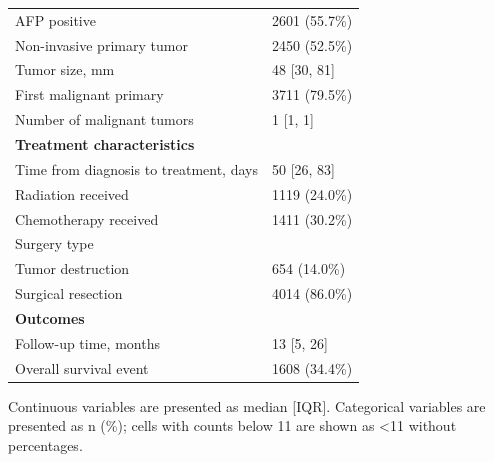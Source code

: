 \begin{table}[!htbp]
\begin{tabular}{ll}
AFP positive & 2601 (55.7\%) \\
Non-invasive primary tumor & 2450 (52.5\%) \\
Tumor size, mm & 48 [30, 81] \\
First malignant primary & 3711 (79.5\%) \\
Number of malignant tumors & 1 [1, 1] \\
\midrule
\multicolumn{2}{l}{\textbf{Treatment characteristics}} \\
Time from diagnosis to treatment, days & 50 [26, 83] \\
Radiation received & 1119 (24.0\%) \\
Chemotherapy received & 1411 (30.2\%) \\
Surgery type &  \\
\hspace{1em}Tumor destruction & 654 (14.0\%) \\
\hspace{1em}Surgical resection & 4014 (86.0\%) \\
\midrule
\multicolumn{2}{l}{\textbf{Outcomes}} \\
Follow-up time, months & 13 [5, 26] \\
Overall survival event & 1608 (34.4\%) \\
\bottomrule
\end{tabular}
\begin{minipage}{0.95\linewidth}
\vspace{0.5em}
\footnotesize Continuous variables are presented as median [IQR]. Categorical variables are presented as n (\%); cells with counts below 11 are shown as <11 without percentages.
\end{minipage}
\end{table}
